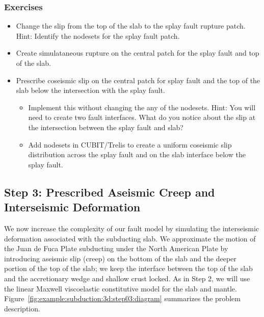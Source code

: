 \subsubsection{Exercises}

\begin{itemize}
\item Change the slip from the top of the slab to the splay fault
  rupture patch. Hint: Identify the nodesets for the splay fault
  patch.
\item Create simulataneous rupture on the central patch for the splay
  fault and top of the slab.
\item Prescribe coseismic slip on the central patch for splay fault
  and the top of the slab below the intersection with the splay fault.
  \begin{itemize}
  \item Implement this without changing the any of the nodesets. Hint:
    You will need to create two fault interfaces. What do you notice
    about the slip at the intersection between the splay fault and slab?
  \item Add nodesets in CUBIT/Trelis to create a uniform coseismic
    slip distribution across the splay fault and on the slab interface
    below the splay fault.
  \end{itemize}
\end{itemize}


\subsection{Step 3: Prescribed Aseismic Creep and Interseismic Deformation}
\label{sec:example:subduction:3d:step03}

We now increase the complexity of our fault model by simulating the
interseismic deformation associated with the subducting slab. We
approximate the motion of the Juan de Fuca Plate subducting under the
North American Plate by introducing aseismic slip (creep) on the
bottom of the slab and the deeper portion of the top of the slab; we
keep the interface between the top of the slab and the accretionary
wedge and shallow crust locked. As in Step 2, we will use the linear
Maxwell viscoelastic constitutive model for the slab and mantle.
Figure~\ref{fig:example:subduction:3d:step03:diagram} summarizes the
problem description.

